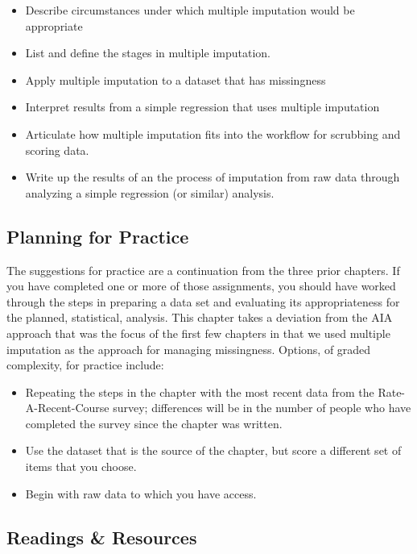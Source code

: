 \documentclass[
]{book}
\providecommand{\tightlist}{%
  \setlength{\itemsep}{0pt}\setlength{\parskip}{0pt}}
\begin{document}
\begin{itemize}
\tightlist
\item
  Describe circumstances under which multiple imputation would be appropriate
\item
  List and define the stages in multiple imputation.
\item
  Apply multiple imputation to a dataset that has missingness
\item
  Interpret results from a simple regression that uses multiple imputation
\item
  Articulate how multiple imputation fits into the workflow for scrubbing and scoring data.
\item
  Write up the results of an the process of imputation from raw data through analyzing a simple regression (or similar) analysis.
\end{itemize}

\hypertarget{planning-for-practice-3}{%
\subsection{Planning for Practice}\label{planning-for-practice-3}}

The suggestions for practice are a continuation from the three prior chapters. If you have completed one or more of those assignments, you should have worked through the steps in preparing a data set and evaluating its appropriateness for the planned, statistical, analysis. This chapter takes a deviation from the AIA \citep{parent_handling_2013} approach that was the focus of the first few chapters in that we used multiple imputation as the approach for managing missingness. Options, of graded complexity, for practice include:

\begin{itemize}
\tightlist
\item
  Repeating the steps in the chapter with the most recent data from the Rate-A-Recent-Course survey; differences will be in the number of people who have completed the survey since the chapter was written.
\item
  Use the dataset that is the source of the chapter, but score a different set of items that you choose.
\item
  Begin with raw data to which you have access.
\end{itemize}

\hypertarget{readings-resources-3}{%
\subsection{Readings \& Resources}\label{readings-resources-3}}
\end{document}
